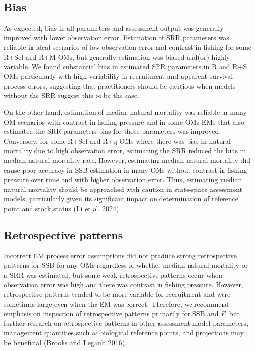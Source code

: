 \documentclass[
  12pt,
]{article}
\begin{document}
\hypertarget{bias-2}{%
\subsection*{Bias}\label{bias-2}}

As expected, bias in all parameters and assessment output was generally
improved with lower observation error. Estimation of SRR parameters was
reliable in ideal scenarios of low observation error and contrast in
fishing for some R+Sel and R+M OMs, but generally estimation was biased
and(or) highly variable. We found substantial bias in estimated SRR
parameters in R and R+S OMs particularly with high variability in
recruitment and apparent survival process errors, suggesting that
practitioners should be cautious when models without the SRR suggest
this to be the case.

On the other hand, estimation of median natural mortality was reliable
in many OM scenarios with contrast in fishing pressure and in some OMs
EMs that also estimated the SRR parameters bias for those parameters was
improved. Conversely, for some R+Sel and R+q OMs where there was bias in
natural mortality due to high observation error, estimating the SRR
reduced the bias in median natural mortality rate. However, estimating
median natural mortality did cause poor accuracy in SSB estimation in
many OMs without contrast in fishing pressure over time and with higher
observation error. Thus, estimating median natural mortality should be
approached with caution in state-space assessment models, particularly
given its significant impact on determination of reference point and
stock status (Li et al. 2024).

\hypertarget{retrospective-patterns}{%
\subsection*{Retrospective patterns}\label{retrospective-patterns}}

Incorrect EM process error assumptions did not produce strong
retrospective patterns for SSB for any OMs regardless of whether median
natural mortality or a SRR was estimated, but some weak retrospective
patterns occur when observation error was high and there was contrast in
fishing pressure. However, retrospective patterns tended to be more
variable for recruitment and were sometimes large even when the EM was
correct. Therefore, we recommend emphasis on inspection of retrospective
patterns primarily for SSB and \(F\), but further research on
retrospective patterns in other assessment model parameters, management
quantities such as biological reference points, and projections may be
beneficial (Brooks and Legault 2016).
\end{document}
